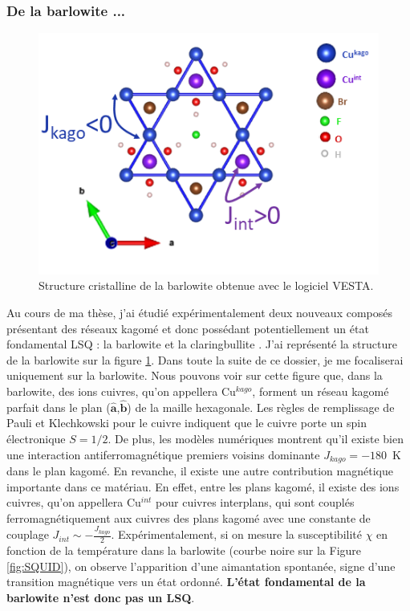 \subsubsection{De la barlowite ...}
\begin{figure}
    \centering
      \includegraphics[width=1.\linewidth]{Fig3.png} 
      \caption{
        Structure cristalline de la barlowite obtenue avec le logiciel VESTA.
      }
      \label{fig:barlowite}
  \end{figure}
Au cours de ma thèse, j'ai étudié expérimentalement deux nouveaux composés présentant des réseaux kagomé et donc possédant potentiellement un état fondamental LSQ : la barlowite  et la claringbullite . J'ai représenté la structure de la barlowite  sur la figure \ref{fig:barlowite}. Dans toute la suite de ce dossier, je me focaliserai uniquement sur la barlowite. Nous pouvons voir sur cette figure que, dans la barlowite, des ions cuivres, qu'on appellera Cu$^{kago}$, forment un réseau kagomé parfait dans le plan ($\mathbf{\hat{a}}$,$\mathbf{\hat{b}}$) de la maille hexagonale. Les règles de remplissage de Pauli et Klechkowski pour le cuivre indiquent que le cuivre porte un spin électronique $S=1/2$. De plus, les modèles numériques montrent qu'il existe bien une interaction antiferromagnétique premiers voisins dominante $J_{kago}=-180$~K dans le plan kagomé. En revanche, il existe une autre contribution magnétique importante dans ce matériau. En effet, entre les plans kagomé, il existe des ions cuivres, qu'on appellera Cu$^{int}$ pour cuivres interplans, qui sont couplés ferromagnétiquement aux cuivres des plans kagomé avec une constante de couplage $J_{int}\sim-\frac{J_{kago}}{2}$. Expérimentalement, si on mesure la susceptibilité $\chi$ en fonction de la température dans la barlowite (courbe noire sur la Figure \ref{fig:SQUID}), on observe l'apparition d'une aimantation spontanée, signe d'une transition magnétique vers un état ordonné. \textbf{L'état fondamental de la barlowite n'est donc pas un LSQ}.\\

